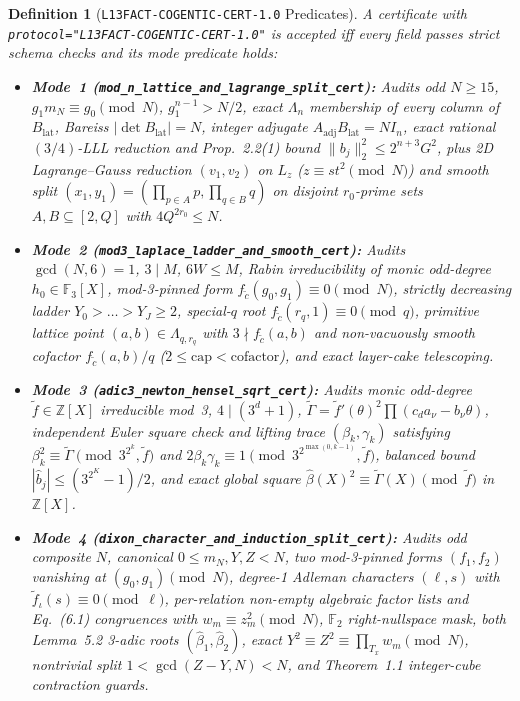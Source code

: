 \documentclass[10pt,twocolumn]{article}
\newtheorem{definition}{Definition}
\newcommand{\ZZ}{\mathbb{Z}}
\newcommand{\FF}{\mathbb{F}}
\begin{document}
{\begin{definition}[\texttt{L13FACT-COGENTIC-CERT-1.0} Predicates]\label{def:cert}
\normalfont A certificate with \texttt{protocol="L13FACT-\allowbreak COGENTIC-\allowbreak CERT-1.0"} is accepted iff every field passes strict schema checks and its mode predicate holds:
\begin{itemize}[leftmargin=1.2em,itemsep=1pt,topsep=2pt]
  \item \textbf{Mode~1 (\texttt{mod\_n\_\allowbreak lattice\_\allowbreak and\_\allowbreak lagrange\_\allowbreak split\_\allowbreak cert}):} Audits odd $N\ge 15$, $g_1 m_N\equiv g_0\pmod N$, $g_1^{n-1}>N/2$, exact $\Lambda_n$ membership of every column of $B_{\mathrm{lat}}$, Bareiss $|\det B_{\mathrm{lat}}|=N$, integer adjugate $A_{\mathrm{adj}} B_{\mathrm{lat}}=N I_n$, exact rational $(3/4)$-LLL reduction and Prop.~2.2(1) bound $\|b_j\|_2^2\le 2^{n+3}G^2$, plus 2D Lagrange--Gauss reduction $(v_1,v_2)$ on $L_z$ ($z\equiv s t^2\pmod N$) and smooth split $(x_1,y_1)=(\prod_{p\in A}p,\prod_{q\in B}q)$ on disjoint $r_0$-prime sets $A,B\subseteq[2,Q]$ with $4Q^{2r_0}\le N$.
  \item \textbf{Mode~2 (\texttt{mod3\_\allowbreak laplace\_\allowbreak ladder\_\allowbreak and\_\allowbreak smooth\_\allowbreak cert}):} Audits $\gcd(N,6)=1$, $3\mid M$, $6W\le M$, Rabin irreducibility of monic odd-degree $h_0\in\FF_3[X]$, mod-3-pinned form $f_{\tilde{c}}(g_0,g_1)\equiv 0\pmod N$, strictly decreasing ladder $Y_0>\dots>Y_J\ge 2$, special-$q$ root $f_{\tilde{c}}(r_q,1)\equiv 0\pmod q$, primitive lattice point $(a,b)\in\Lambda_{q,r_q}$ with $3\nmid f_{\tilde{c}}(a,b)$ and non-vacuously smooth cofactor $f_{\tilde{c}}(a,b)/q$ ($2\le\mathrm{cap}<\mathrm{cofactor}$), and exact layer-cake telescoping.
  \item \textbf{Mode~3 (\texttt{adic3\_\allowbreak newton\_\allowbreak hensel\_\allowbreak sqrt\_\allowbreak cert}):} Audits monic odd-degree $\tilde{f}\in\ZZ[X]$ irreducible mod~3, $4\mid(3^d+1)$, $\tilde{\Gamma}=\tilde{f}'(\theta)^2\prod(c_d a_\nu-b_\nu\theta)$, independent Euler square check and lifting trace $(\beta_k,\gamma_k)$ satisfying $\beta_k^2\equiv\tilde{\Gamma}\pmod{3^{2^k},\tilde{f}}$ and $2\beta_k\gamma_k\equiv 1\pmod{3^{2^{\max(0,k-1)}},\tilde{f}}$, balanced bound $|\hat{b}_j|\le(3^{2^K}-1)/2$, and exact global square $\hat{\beta}(X)^2\equiv\tilde{\Gamma}(X)\pmod{\tilde{f}}$ in $\ZZ[X]$.
  \item \textbf{Mode~4 (\texttt{dixon\_\allowbreak character\_\allowbreak and\_\allowbreak induction\_\allowbreak split\_\allowbreak cert}):} Audits odd composite $N$, canonical $0\le m_N,Y,Z<N$, two mod-3-pinned forms $(f_1,f_2)$ vanishing at $(g_0,g_1)\pmod N$, degree-1 Adleman characters $(\ell,s)$ with $\tilde{f}_\iota(s)\equiv 0\pmod\ell$, per-relation non-empty algebraic factor lists and Eq.~(6.1) congruences with $w_m\equiv z_m^2\pmod N$, $\FF_2$ right-nullspace mask, both Lemma~5.2 3-adic roots $(\hat{\beta}_1,\hat{\beta}_2)$, exact $Y^2\equiv Z^2\equiv\prod_{T_x}w_m\pmod N$, nontrivial split $1<\gcd(Z-Y,N)<N$, and Theorem~1.1 integer-cube contraction guards.
\end{itemize}
\end{definition}}
\end{document}
